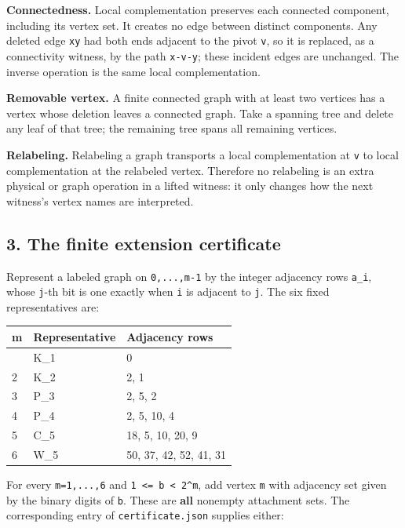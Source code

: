 \documentclass[
  11pt,
]{article}
\begin{document}
\textbf{Connectedness.} Local complementation preserves each connected
component, including its vertex set. It creates no edge between distinct
components. Any deleted edge \texttt{xy} had both ends adjacent to the
pivot \texttt{v}, so it is replaced, as a connectivity witness, by the
path \texttt{x-v-y}; these incident edges are unchanged. The inverse
operation is the same local complementation.

\textbf{Removable vertex.} A finite connected graph with at least two
vertices has a vertex whose deletion leaves a connected graph. Take a
spanning tree and delete any leaf of that tree; the remaining tree spans
all remaining vertices.

\textbf{Relabeling.} Relabeling a graph transports a local
complementation at \texttt{v} to local complementation at the relabeled
vertex. Therefore no relabeling is an extra physical or graph operation
in a lifted witness: it only changes how the next witness's vertex names
are interpreted.

\subsection{3. The finite extension
certificate}\label{the-finite-extension-certificate}

Represent a labeled graph on \texttt{0,...,m-1} by the integer adjacency
rows \texttt{a\_i}, whose \texttt{j}-th bit is one exactly when
\texttt{i} is adjacent to \texttt{j}. The six fixed representatives are:

\begin{longtable}[]{@{}lll@{}}
\toprule\noalign{}
m & Representative & Adjacency rows \\
\midrule\noalign{}
\endhead
\bottomrule\noalign{}
\endlastfoot
1 & K\_1 & 0 \\
2 & K\_2 & 2, 1 \\
3 & P\_3 & 2, 5, 2 \\
4 & P\_4 & 2, 5, 10, 4 \\
5 & C\_5 & 18, 5, 10, 20, 9 \\
6 & W\_5 & 50, 37, 42, 52, 41, 31 \\
\end{longtable}

For every \texttt{m=1,...,6} and
\texttt{1\ \textless{}=\ b\ \textless{}\ 2\^{}m}, add vertex \texttt{m}
with adjacency set given by the binary digits of \texttt{b}. These are
\textbf{all} nonempty attachment sets. The corresponding entry of
\texttt{certificate.json} supplies either:
\end{document}
